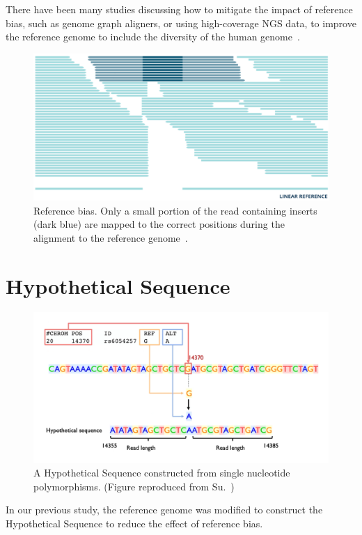 \documentclass[PhD]{PHlab-thesis}
\begin{document}
There have been many studies discussing how to mitigate the impact of reference bias, such as genome graph aligners, or using high-coverage NGS data, to improve the reference genome to include the diversity of the human genome~\cite{Günther2019Refbias, Chen2021Refbias}.

\begin{figure}[h!]
	\centering
	\includegraphics[scale=0.25]{figures/Reference_bias.png}
	\caption{Reference bias. Only a small portion of the read containing inserts (dark blue) are mapped to the correct positions during the alignment to the reference genome~\cite{Lau2017Refbias}.}
	\label{fig:Reference bias} %
\end{figure}

\section{Hypothetical Sequence}
\begin{figure}[h!]
	\centering
	\includegraphics[scale=0.25]{figures/Hypothetical_Sequence.png}
	\caption{A Hypothetical Sequence constructed from single nucleotide polymorphisms. (Figure reproduced from Su.~\cite{Su2021RI})}
	\label{fig:Hypothetical Sequence} %
\end{figure}
In our previous study, the reference genome was modified to construct the Hypothetical Sequence to reduce the effect of reference bias.
\end{document}
